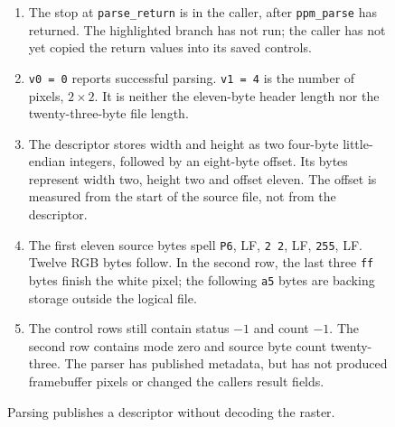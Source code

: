 \begin{figure}[htbp]
\begin{minipage}{\linewidth}
\begin{enumerate}
      \setlength{\itemsep}{0pt}
            \setlength{\parsep}{0pt}
      \item The stop at \texttt{parse\_return} is in the caller, after \texttt{ppm\_parse} has returned. The highlighted branch has not run; the caller has not yet copied the return values into its saved controls.
      \item \texttt{v0 = 0} reports successful parsing. \texttt{v1 = 4} is the number of pixels, $2\times2$. It is neither the eleven-byte header length nor the twenty-three-byte file length.
      \item The descriptor stores width and height as two four-byte little-endian integers, followed by an eight-byte offset. Its bytes represent width two, height two and offset eleven. The offset is measured from the start of the source file, not from the descriptor.
      \item The first eleven source bytes spell \texttt{P6}, LF, \texttt{2 2}, LF, \texttt{255}, LF. Twelve RGB bytes follow. In the second row, the last three \texttt{ff} bytes finish the white pixel; the following \texttt{a5} bytes are backing storage outside the logical file.
      \item The control rows still contain status $-1$ and count $-1$. The second row contains mode zero and source byte count twenty-three. The parser has published metadata, but has not produced framebuffer pixels or changed the caller\textquotesingle s result fields.
    \end{enumerate}
  \end{minipage}
  \caption{Parsing publishes a descriptor without decoding the raster.}
  \label{capture:029-binary-ppm-f01}
  \label{ppm-f01}
\end{figure}
\par
